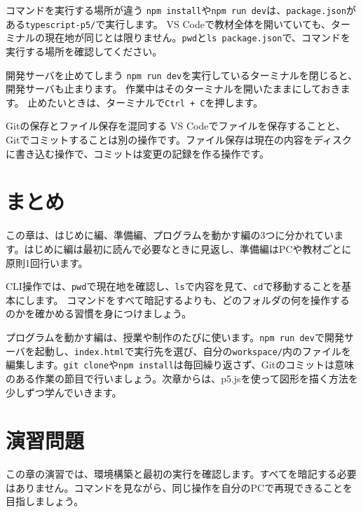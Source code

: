 \begin{mistakebox}{コマンドを実行する場所が違う}
\texttt{npm install}や\texttt{npm run dev}は、\texttt{package.json}がある\texttt{typescript-p5/}で実行します。
VS Codeで教材全体を開いていても、ターミナルの現在地が同じとは限りません。\texttt{pwd}と\texttt{ls package.json}で、コマンドを実行する場所を確認してください。
\end{mistakebox}

\begin{mistakebox}{開発サーバを止めてしまう}
\texttt{npm run dev}を実行しているターミナルを閉じると、開発サーバも止まります。
作業中はそのターミナルを開いたままにしておきます。
止めたいときは、ターミナルで\texttt{Ctrl + C}を押します。
\end{mistakebox}

\begin{mistakebox}{Gitの保存とファイル保存を混同する}
VS Codeでファイルを保存することと、Gitでコミットすることは別の操作です。ファイル保存は現在の内容をディスクに書き込む操作で、コミットは変更の記録を作る操作です。
\end{mistakebox}

\section{まとめ}

この章は、はじめに編、準備編、プログラムを動かす編の3つに分かれています。はじめに編は最初に読んで必要なときに見返し、準備編はPCや教材ごとに原則1回行います。

CLI操作では、\texttt{pwd}で現在地を確認し、\texttt{ls}で内容を見て、\texttt{cd}で移動することを基本にします。
コマンドをすべて暗記するよりも、どのフォルダの何を操作するのかを確かめる習慣を身につけましょう。

プログラムを動かす編は、授業や制作のたびに使います。\texttt{npm run dev}で開発サーバを起動し、\texttt{index.html}で実行先を選び、自分の\texttt{workspace/}内のファイルを編集します。\texttt{git clone}や\texttt{npm install}は毎回繰り返さず、Gitのコミットは意味のある作業の節目で行いましょう。次章からは、p5.jsを使って図形を描く方法を少しずつ学んでいきます。

\section{演習問題}

この章の演習では、環境構築と最初の実行を確認します。すべてを暗記する必要はありません。コマンドを見ながら、同じ操作を自分のPCで再現できることを目指しましょう。

